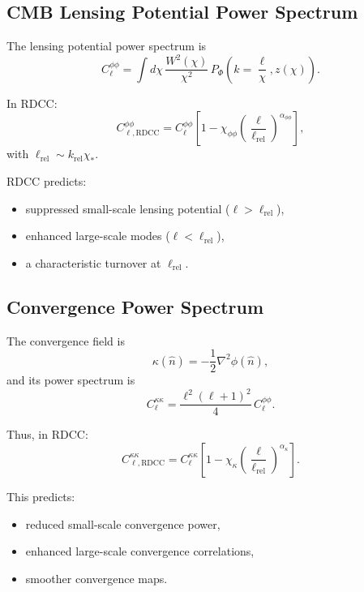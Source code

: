 \documentclass[11pt,a4paper]{article}
\begin{document}
\subsection{CMB Lensing Potential Power Spectrum}

The lensing potential power spectrum is
\begin{equation}
C_{\ell}^{\phi\phi}
=
\int d\chi\,
\frac{W^{2}(\chi)}{\chi^{2}}\,
P_{\Phi}\!\left(k=\frac{\ell}{\chi},z(\chi)\right).
\end{equation}

In RDCC:
\begin{equation}
C_{\ell,\mathrm{RDCC}}^{\phi\phi}
=
C_{\ell}^{\phi\phi}
\left[
1
-
\chi_{\phi\phi}
\left(
\frac{\ell}{\ell_{\mathrm{rel}}}
\right)^{\alpha_{\phi\phi}}
\right],
\end{equation}
with $\ell_{\mathrm{rel}} \sim k_{\mathrm{rel}}\chi_{*}$.

RDCC predicts:
\begin{itemize}
\item suppressed small-scale lensing potential ($\ell > \ell_{\mathrm{rel}}$),
\item enhanced large-scale modes ($\ell < \ell_{\mathrm{rel}}$),
\item a characteristic turnover at $\ell_{\mathrm{rel}}$.
\end{itemize}

\subsection{Convergence Power Spectrum}

The convergence field is
\begin{equation}
\kappa(\hat{n})
=
-\frac{1}{2}\nabla^{2}\phi(\hat{n}),
\end{equation}
and its power spectrum is
\begin{equation}
C_{\ell}^{\kappa\kappa}
=
\frac{\ell^{2}(\ell+1)^{2}}{4}\,
C_{\ell}^{\phi\phi}.
\end{equation}

Thus, in RDCC:
\begin{equation}
C_{\ell,\mathrm{RDCC}}^{\kappa\kappa}
=
C_{\ell}^{\kappa\kappa}
\left[
1
-
\chi_{\kappa}
\left(
\frac{\ell}{\ell_{\mathrm{rel}}}
\right)^{\alpha_{\kappa}}
\right].
\end{equation}

This predicts:
\begin{itemize}
\item reduced small-scale convergence power,
\item enhanced large-scale convergence correlations,
\item smoother convergence maps.
\end{itemize}
\end{document}
